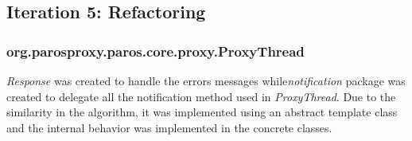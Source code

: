 \subsection{Iteration 5: Refactoring}
\subsubsection{org.parosproxy.paros.core.proxy.ProxyThread}

\textit{Response} was created to handle the errors messages while\textit{notification} package was created to delegate all the notification method used in \textit{ProxyThread}. Due to the similarity in the algorithm, it was implemented using an abstract template class and the internal behavior was implemented in the concrete classes.

